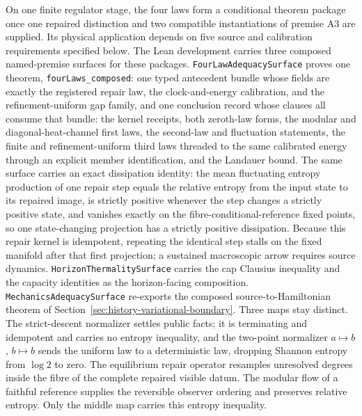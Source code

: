 \documentclass[11pt]{article}
\begin{document}
On one finite regulator stage, the four laws form a conditional theorem
package once one repaired distinction and two compatible instantiations of
premise A3 are supplied. Its physical application depends on five source and
calibration requirements specified below.
The Lean development carries three composed named-premise surfaces for
these packages. \texttt{FourLawAdequacySurface} proves one theorem,
\texttt{fourLaws\_composed}: one typed antecedent bundle whose fields
are exactly the registered repair law, the clock-and-energy
calibration, and the refinement-uniform gap family, and one conclusion
record whose clauses all consume that bundle: the kernel receipts,
both zeroth-law forms, the modular and diagonal-heat-channel first
laws, the second-law and fluctuation statements, the finite and
refinement-uniform third laws threaded to the same calibrated energy
through an explicit member identification, and the Landauer bound.
The same surface carries an exact dissipation identity: the mean
fluctuating entropy production of one repair step equals the relative
entropy from the input state to its repaired image, is strictly
positive whenever the step changes a strictly positive state, and
vanishes exactly on the fibre-conditional-reference fixed points, so
one state-changing projection has a strictly positive dissipation. Because this repair kernel is idempotent,
repeating the identical step stalls on the fixed manifold after that first
projection; a sustained macroscopic arrow requires source dynamics.
\texttt{HorizonThermalitySurface} carries the cap
Clausius inequality and the capacity identities as the horizon-facing
composition. \texttt{MechanicsAdequacySurface} re-exports the composed
source-to-Hamiltonian theorem of
Section~\ref{sec:history-variational-boundary}.
Three maps stay distinct. The strict-descent normalizer settles
public facts; it is terminating and idempotent and carries no entropy
inequality, and the two-point normalizer \(a\mapsto b\), \(b\mapsto b\)
sends the uniform law to a deterministic law, dropping Shannon entropy
from \(\log 2\) to zero. The equilibrium repair operator resamples
unresolved degrees inside the fibre of the complete repaired visible
datum. The modular flow of a faithful reference supplies the reversible
observer ordering and preserves relative entropy. Only the middle map
carries this entropy inequality.
\end{document}
